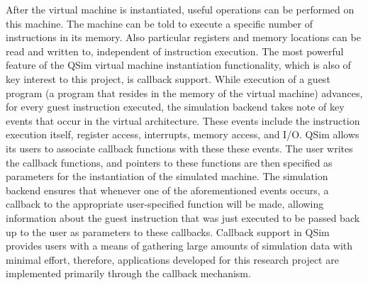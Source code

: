 \documentclass[letterpaper,11pt,twocolumn]{article}
\begin{document}
After the virtual machine is instantiated, useful operations can be performed on 
this machine. The machine can be told to execute a specific number of 
instructions in its memory. Also particular registers and memory locations can 
be read and written to, independent of instruction execution.
The most powerful feature of the QSim virtual machine instantiation functionality, which is also of key interest to this project, is callback support. While execution of a guest program (a program that resides in the memory of the virtual machine) advances, for every guest instruction executed, the simulation backend takes note of key events that occur in the virtual architecture. These events include the instruction execution itself, register access, interrupts, memory access, and I/O. QSim allows its users to associate callback functions with these these events. The user writes the callback functions, and pointers to these functions are then specified as parameters for the instantiation of the simulated machine. The simulation backend ensures that whenever one of the aforementioned events occurs, a callback to the appropriate user-specified function will be made, allowing information about the guest instruction that was just executed to be passed back up to the user as parameters to these callbacks. Callback support in QSim provides users with a means of gathering large amounts of simulation data with minimal effort, therefore, applications developed for this research project are implemented primarily through the callback mechanism.
\end{document}
